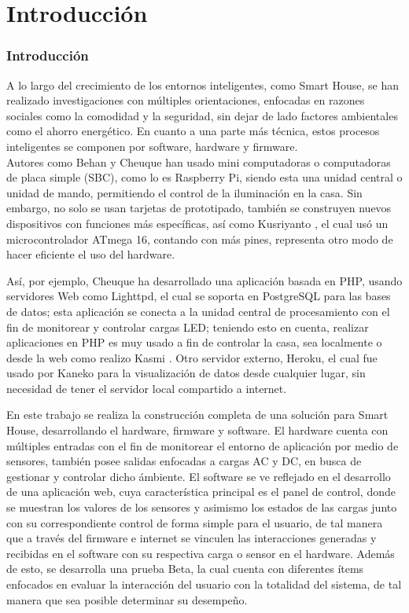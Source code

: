 \section{Introducción}
\begin{frame}
\frametitle{Introducción}

 A lo largo del crecimiento de los entornos inteligentes, como Smart House, se han realizado investigaciones con múltiples orientaciones, enfocadas en razones sociales como la comodidad y la seguridad, sin dejar de lado factores ambientales como el ahorro energético. En cuanto a una parte más técnica, estos procesos inteligentes se componen por software, hardware y firmware.\\
 
 Autores como Behan \cite{Behan2013} y Cheuque \cite{Cheuque2015} han usado mini computadoras o computadoras de placa simple (SBC), como lo es Raspberry Pi, siendo esta una unidad central o unidad de mando, permitiendo el control de la iluminación en la casa. Sin embargo, no solo se usan tarjetas de prototipado, también se construyen nuevos dispositivos con funciones más específicas, así como Kusriyanto \cite{Kusriyanto2015}, el cual usó un microcontrolador ATmega 16, contando con más pines, representa otro modo de hacer eficiente el uso del hardware.

\end{frame}
\begin{frame}

 Así, por ejemplo, Cheuque \cite{Cheuque2015} ha desarrollado una aplicación basada en PHP, usando servidores Web como Lighttpd, el cual se soporta en PostgreSQL para las bases de datos; esta aplicación se conecta a la unidad central de procesamiento con el fin de monitorear y controlar cargas LED; teniendo esto en cuenta, realizar aplicaciones en PHP es muy usado a fin de controlar la casa, sea localmente o desde la web como realizo Kasmi \cite{Kasmi2016}. Otro servidor externo, Heroku, el cual fue usado por Kaneko \cite{Kaneko2017} para la visualización de datos desde cualquier lugar, sin necesidad de tener el servidor local compartido a internet.
\end{frame}

\begin{frame}
 En este trabajo se realiza la construcción completa de una solución para Smart House, desarrollando el hardware, firmware y software. El hardware cuenta con múltiples entradas con el fin de monitorear el entorno de aplicación por medio de sensores, también posee salidas enfocadas a cargas AC y DC, en busca de gestionar y controlar dicho ámbiente. El software se ve reflejado en el desarrollo de una aplicación web, cuya característica principal es el panel de control, donde se muestran los valores de los sensores y asimismo los estados de las cargas junto con su correspondiente control de forma simple para el usuario, de tal manera que a través del firmware e internet se vinculen las interacciones generadas y recibidas en el software con su respectiva carga o sensor en el hardware. Además de esto, se desarrolla una prueba Beta, la cual cuenta con diferentes ítems enfocados en evaluar la interacción del usuario con la totalidad del sistema, de tal manera que sea posible determinar su desempeño.
\end{frame}